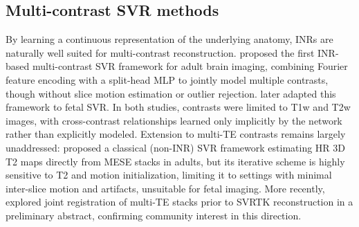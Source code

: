 \documentclass[preprint,authoryear,12pt]{elsarticle}
\begin{document}
\subsection{Multi-contrast SVR methods}

By learning a continuous representation of the underlying anatomy, INRs are naturally well suited for multi-contrast reconstruction. \citet{mcginnis_single-subject_2023} proposed the first INR-based multi-contrast SVR framework for adult brain imaging, combining Fourier feature encoding \citep{tancik_fourier_2020} with a split-head MLP to jointly model multiple contrasts, though without slice motion estimation or outlier rejection. \citet{link-sourani_joint_2025} later adapted this framework to fetal SVR. In both studies, contrasts were limited to T1w and T2w images, with cross-contrast relationships learned only implicitly by the network rather than explicitly modeled. Extension to multi-TE contrasts remains largely unaddressed: \citet{beirinckx_model-based_2022} proposed a classical (non-INR) SVR framework estimating HR 3D T2 maps directly from MESE stacks in adults, but its iterative scheme is highly sensitive to T2 and motion initialization, limiting it to settings with minimal inter-slice motion and artifacts, unsuitable for fetal imaging. More recently, \citet{bhattacharya2025joint} explored joint registration of multi-TE stacks prior to SVRTK reconstruction in a preliminary abstract, confirming community interest in this direction.
\end{document}
